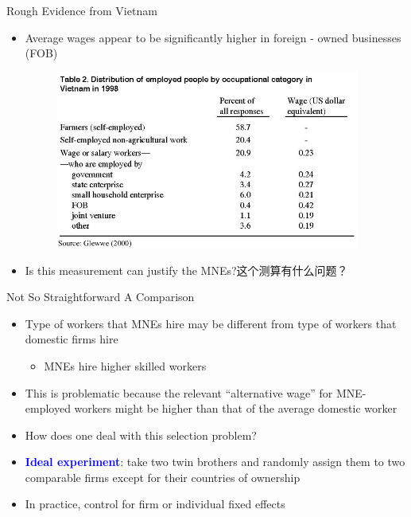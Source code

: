 \documentclass[10pt,hyperref={CJKbookmarks=true},xcolor=dvipsnames,aspectratio=169]{beamer}
\begin{document}
\begin{frame}{Rough Evidence from Vietnam }

\begin{itemize}
\item Average wages appear to be significantly higher in foreign - owned
businesses (FOB) 
\begin{figure}


\centering{}\includegraphics[width=10cm]{fig/fdi/lec7-12}
\end{figure}

\item Is this measurement can justify the MNEs?这个测算有什么问题？
\end{itemize}
\end{frame}

\begin{frame}{Not So Straightforward A Comparison}

\begin{itemize}
\item Type of workers that MNEs hire may be different from type of workers
that domestic firms hire 

\begin{itemize}
\item MNEs hire higher skilled workers 
\end{itemize}
\item This is problematic because the relevant “alternative wage” for MNE-
employed workers might be higher than that of the average domestic
worker 
\item How does one deal with this selection problem? 
\item \textbf{\textcolor{blue}{Ideal experiment}}: take two twin brothers
and randomly assign them to two comparable firms except for their
countries of ownership 
\item In practice, control for firm or individual fixed effects 
\end{itemize}
\end{frame}
\end{document}
